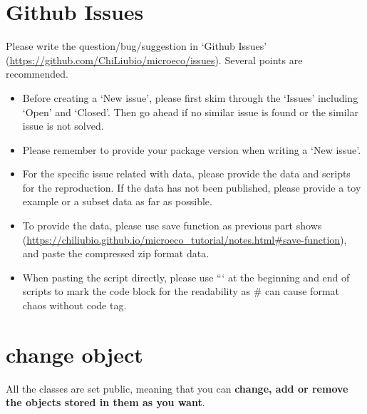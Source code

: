 \documentclass[
]{book}
\newenvironment{Shaded}{\begin{snugshade}}{\end{snugshade}}
\newcommand{\AttributeTok}[1]{\textcolor[rgb]{0.77,0.63,0.00}{#1}}
\newcommand{\CommentTok}[1]{\textcolor[rgb]{0.56,0.35,0.01}{\textit{#1}}}
\newcommand{\DecValTok}[1]{\textcolor[rgb]{0.00,0.00,0.81}{#1}}
\newcommand{\FunctionTok}[1]{\textcolor[rgb]{0.00,0.00,0.00}{#1}}
\newcommand{\NormalTok}[1]{#1}
\newcommand{\OtherTok}[1]{\textcolor[rgb]{0.56,0.35,0.01}{#1}}
\newcommand{\SpecialCharTok}[1]{\textcolor[rgb]{0.00,0.00,0.00}{#1}}
\begin{document}
\hypertarget{github-issues}{%
\section{Github Issues}\label{github-issues}}

Please write the question/bug/suggestion in `Github Issues' (\url{https://github.com/ChiLiubio/microeco/issues}).
Several points are recommended.

\begin{itemize}
\item
  Before creating a `New issue', please first skim through the `Issues' including `Open' and `Closed'.
  Then go ahead if no similar issue is found or the similar issue is not solved.
\item
  Please remember to provide your package version when writing a `New issue'.
\item
  For the specific issue related with data, please provide the data and scripts for the reproduction.
  If the data has not been published, please provide a toy example or a subset data as far as possible.
\item
  To provide the data, please use save function as previous part shows (\url{https://chiliubio.github.io/microeco_tutorial/notes.html\#save-function}),
  and paste the compressed zip format data.
\item
  When pasting the script directly, please use ``` at the beginning and end of scripts to mark the code block for the readability
  as \# can cause format chaos without code tag.
\end{itemize}

\hypertarget{change-object}{%
\section{change object}\label{change-object}}

All the classes are set public, meaning that you can \textbf{change, add or remove the objects stored in them as you want}.

\begin{Shaded}
\end{Shaded}
\end{document}
